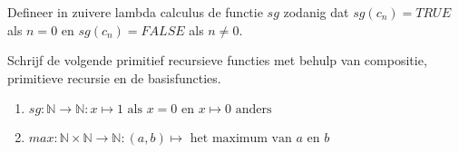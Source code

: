 \documentclass[a4paper]{article}
\begin{document}
\begin{question}
Defineer in zuivere lambda calculus de functie $sg$ zodanig dat $sg(c_n) = TRUE$ als $n = 0$ en $sg(c_n) = FALSE$ als $n \neq 0$.
\end{question}

\begin{question}
Schrijf de volgende primitief recursieve functies met behulp van compositie, primitieve recursie en de basisfuncties.
\begin{enumerate}
  \item $sg : \mathbb{N} \to \mathbb{N} : x \mapsto 1 \text{ als $x = 0$ en $x \mapsto 0$ anders}$
  \item $max : \mathbb{N} \times \mathbb{N} \to \mathbb{N} : (a,b) \mapsto \text{ het maximum van $a$ en $b$}$
\end{enumerate}
\end{question}
\end{document}
